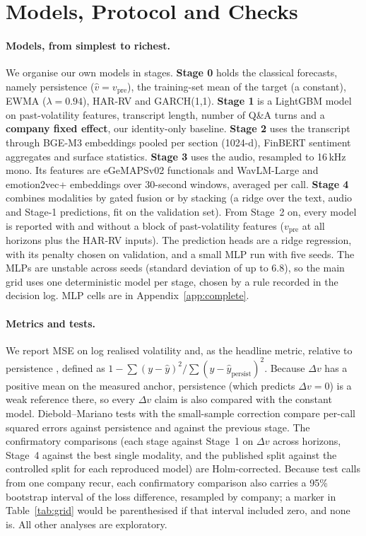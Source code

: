 \section{Models, Protocol and Checks}
\label{sec:setup}

\paragraph{Models, from simplest to richest.}
We organise our own models in stages. \textbf{Stage 0} holds the classical
forecasts, namely persistence ($\hat v=v_{\mathrm{pre}}$), the training-set mean
of the target (a constant), EWMA ($\lambda{=}0.94$), HAR-RV \citep{corsi2009har}
and GARCH(1,1). \textbf{Stage 1} is a LightGBM model on past-volatility features,
transcript length, number of Q\&A turns and a \textbf{company fixed effect}, our
identity-only baseline. \textbf{Stage 2} uses the transcript through BGE-M3
\citep{bge2024} embeddings pooled per section (1024-d), FinBERT \citep{finbert}
sentiment aggregates and surface statistics. \textbf{Stage 3} uses the audio,
resampled to 16\,kHz mono. Its features are eGeMAPSv02 functionals
\citep{opensmile} and WavLM-Large \citep{wavlm} and emotion2vec+
\citep{emotion2vec} embeddings over 30-second windows, averaged per call. \textbf{Stage 4} combines modalities by
gated fusion or by stacking (a ridge over the text, audio and Stage-1 predictions,
fit on the validation set). From Stage~2 on, every model is reported with and
without a block of past-volatility features ($v_{\mathrm{pre}}$ at all horizons
plus the HAR-RV inputs). The prediction heads are a ridge regression, with its
penalty chosen on validation, and a small MLP run with five seeds. The MLPs are
unstable across seeds (standard deviation of \Rtwo{} up to 6.8), so the main grid
uses one deterministic model per stage, chosen by a rule recorded in the decision
log. MLP cells are in Appendix~\ref{app:complete}.

\paragraph{Metrics and tests.}
We report MSE on log realised volatility and, as the headline metric, \Rtwo{}
relative to persistence \citep{gukellyxiu2020}, defined as
$1-\sum(y-\hat y)^2/\sum(y-\hat y_{\mathrm{persist}})^2$. Because $\Delta v$ has a
positive mean on the measured anchor, persistence (which predicts $\Delta v{=}0$)
is a weak reference there, so every $\Delta v$ claim is also compared with the
constant model. Diebold--Mariano tests \citep{dm1995} with the small-sample
correction compare per-call squared errors against persistence and against the
previous stage. The confirmatory comparisons (each stage against Stage~1 on
$\Delta v$ across horizons, Stage~4 against the best single modality, and the
published split against the controlled split for each reproduced model) are
Holm-corrected. Because test calls from one company recur, each confirmatory
comparison also carries a 95\% bootstrap interval of the loss difference,
resampled by company; a marker in Table~\ref{tab:grid} would be parenthesised
if that interval included zero, and none is. All other analyses are exploratory.

